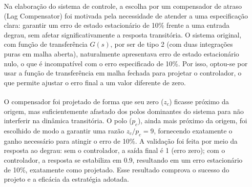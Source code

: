 \documentclass[a4paper,11pt]{article}
\begin{document}
Na elaboração do sistema de controle, a escolha por um compensador de atraso (Lag Compensator) foi motivada pela necessidade de atender a uma especificação clara: garantir um erro de estado estacionário de 10\% frente a uma entrada degrau, sem afetar significativamente a resposta transitória. O sistema original, com função de transferência $G(s)$, por ser de tipo 2 (com duas integrações puras em malha aberta), naturalmente apresentava erro de estado estacionário nulo, o que é incompatível com o erro especificado de 10\%. Por isso, optou-se por usar a função de transferência em malha fechada para projetar o controlador, o que permite ajustar o erro final a um valor diferente de zero.
\\\\
O compensador foi projetado de forma que seu zero ($z_c$) ficasse próximo da origem, mas suficientemente afastado dos polos dominantes do sistema para não interferir na dinâmica transitória. O polo ($p_c$), ainda mais próximo da origem, foi escolhido de modo a garantir uma razão $z_c/p_c = 9$, fornecendo exatamente o ganho necessário para atingir o erro de 10\%. A validação foi feita por meio da resposta ao degrau: sem o controlador, a saída final é 1 (erro zero); com o controlador, a resposta se estabiliza em 0.9, resultando em um erro estacionário de 10\%, exatamente como projetado. Esse resultado comprova o sucesso do projeto e a eficácia da estratégia adotada.
\end{document}
